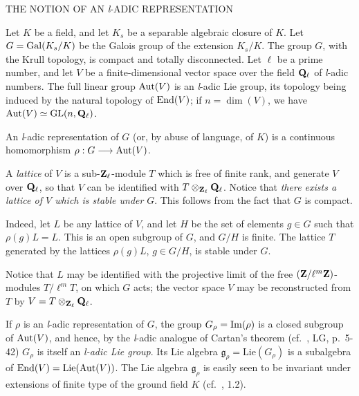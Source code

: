 
%
  {THE NOTION OF AN \textit{l}-ADIC REPRESENTATION}


Let $K$ be a field, and let $K_s$ be a separable algebraic closure of
$K$.  Let $G = \mathrm{Gal}(K_s/K)$ be the Galois group of the extension
$K_s/K$.  The group $G$, with the Krull topology, is compact and totally
disconnected.  Let $\ell$ be a prime number, and let $V$ be a
finite-dimensional vector space over the field $\mathbf{Q}_\ell$ of
\textit{l}-adic numbers.  The full linear group $\mathrm{Aut}(V)$ is an
\textit{l}-adic Lie group, its topology being induced by the natural
topology of $\mathrm{End}(V)$; if $n = \dim(V)$, we have
$\mathrm{Aut}(V) \simeq \mathrm{GL}(n, \mathbf{Q}_\ell)$.

\begin{dfn}
An \textit{l}-adic representation of $G$ (or, by abuse of language, of
$K$) is a continuous homomorphism $\rho : G \longrightarrow \mathrm{Aut}(V)$.
\end{dfn}

\begin{remarks}
\begin{nlist}
\item A \emph{lattice} of $V$ is a sub-$\mathbf{Z}_\ell$-module $T$ which is
free of finite rank, and generate $V$ over $\mathbf{Q}_\ell$, so that $V$ can be
identified with $T \mathbin{\otimes}_{\mathbf{Z}_\ell} \mathbf{Q}_\ell$.  Notice that
\emph{there exists a lattice of $V$ which is stable under} $G$.
This follows from the fact that $G$ is compact.

Indeed, let $L$ be any lattice of $V$, and let $H$ be the set of
elements $g \in G$ such that $\rho(g)L = L$.  This is an open subgroup
of $G$, and $G/H$ is finite.  The lattice $T$ generated by the lattices
$\rho(g)L$, $g \in G/H$, is stable under $G$.

Notice that $L$ may be identified with the projective limit of the free
$(\mathbf{Z}/\ell^m\mathbf{Z})$-modules $T/\ell^m T$, on which $G$ acts; the vector
space $V$ may be reconstructed from $T$ by
$V = T \mathbin{\otimes}_{\mathbf{Z}_\ell} \mathbf{Q}_\ell$.

\item If $\rho$ is an \textit{l}-adic representation of $G$, the group
$G_\rho = \mathrm{Im}(\rho)$ is a closed subgroup of $\mathrm{Aut}(V)$, and hence, by
the \textit{l}-adic analogue of Cartan's theorem
(cf.~\cite{serre-liealg}, LG, p.~5-42) $G_\rho$ is itself an
\emph{\textit{l}-adic Lie group}.  Its Lie algebra
$\mathfrak{g}_\rho = \mathrm{Lie}(G_\rho)$ is a subalgebra of
$\mathrm{End}(V) = \mathrm{Lie}(\mathrm{Aut}(V))$.  The Lie algebra $\mathfrak{g}_\rho$
is easily seen to be invariant under extensions of finite type of the
ground field $K$ (cf.~\cite{serre-congr}, 1.2).
\end{nlist}
\end{remarks}

